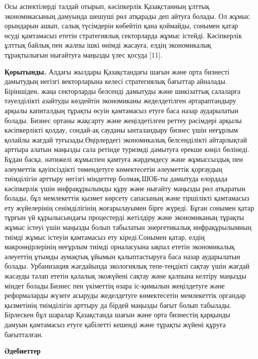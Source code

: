 \begin{multicols}{2}
Осы аспектілерді талдай отырып, кәсіпкерлік Қазақстанның ұлттық
экономикасының дамуында шешуші рөл атқарады деп айтуға болады. Ол жұмыс
орындарын ашып, салық түсімдерін көбейтіп қана қоймайды, сонымен қатар
өсуді қамтамасыз ететін стратегиялық секторларда жұмыс істейді.
Кәсіпкерлік ұлттық байлық пен жалпы ішкі өнімді жасауға, елдің
экономикалық тұрақтылығын нығайтуға маңызды үлес қосуда {[}11{]}.

{\bfseries Қорытынды.} Алдағы жылдары Қазақстандағы шағын және орта бизнесті
дамытудың негізгі векторларына келесі стратегиялық бағыттар айналады.
Біріншіден, жаңа секторларды белсенді дамытуды және шикізаттық салаларға
тәуелділікті азайтуды көздейтін экономиканы жеделдетілген әртараптандыру
арқылы капиталдың тұрақты өсуін қамтамасыз етуге баса назар аударылатын
болады. Бизнес ортаны жақсарту және жеңілдетілген реттеу рәсімдері
арқылы кәсіпкерлікті қолдау, сондай-ақ сауданы ынталандыру бизнес үшін
неғұрлым қолайлы жағдай туғызады.Өңірлердегі экономикалық белсенділікті
айтарлықтай арттыра алатын маңызды сала ретінде туризмді дамытуға ерекше
көңіл бөлінеді. Бұдан басқа, нәтижелі жұмыспен қамтуға жәрдемдесу және
жұмыссыздық пен әлеуметтік қауіпсіздікті төмендетуге көмектесетін
әлеуметтік қорғаудың тиімділігін арттыру негізгі міндеттер болмақ.ШОБ-ты
дамытуда елордада кәсіпкерлік үшін инфрақұрылымды құру және нығайту
маңызды рөл атқаратын болады, бұл мемлекеттік қызмет көрсету сапасының
және тіршілікті қамтамасыз ету жүйелерінің сенімділігінің жоғарылауымен
бірге жүреді. Бұған сонымен қатар тұрғын үй құрылысындағы процестерді
жетілдіру және экономиканың тұрақты жұмыс істеуі үшін маңызды болып
табылатын энергетикалық инфрақұрылымның тиімді жұмыс істеуін қамтамасыз
ету кіреді.Сонымен қатар, елдің макроөңірлерінің неғұрлым тиімді
орналасуына ықпал ететін экономикалық әлеуеттің ұтымды аумақтық ұйымын
қалыптастыруға баса назар аударылатын болады. Урбанизация жағдайында
экологиялық тепе-теңдікті сақтау үшін жағдай жасауды талап ететін
қалалық экожүйені сақтау және қалпына келтіру маңызды міндет
болады.Бизнес пен үкіметтің өзара іс-қимылын жеңілдетуге және
реформаларды жүзеге асыруды жеделдетуге көмектесетін мемлекеттік
органдар қызметінің тиімділігін арттыру да бірдей маңызды бағыт болып
табылады. Бірлескен бұл шаралар Қазақстанда шағын және орта бизнестің
қарқынды дамуын қамтамасыз етуге қабілетті кешенді және тұрақты жүйені
құруға бағытталған.
\end{multicols}

\begin{center}
{\bfseries Әдебиеттер}
\end{center}

